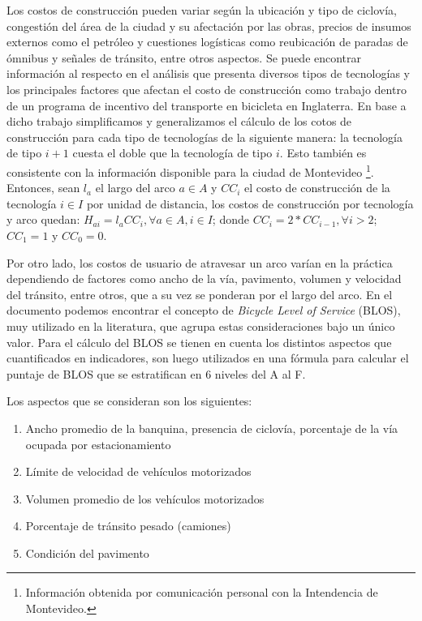 Los costos de construcción pueden variar según la ubicación y tipo de ciclovía, congestión del área de la ciudad y su afectación por las obras, precios de insumos externos como el petróleo y cuestiones logísticas como reubicación de paradas de ómnibus y señales de tránsito, entre otros aspectos. Se puede encontrar información al respecto en el análisis \cite{typicalcostsofcylcing} que presenta diversos tipos de tecnologías y los principales factores que afectan el costo de construcción como trabajo dentro de un programa de incentivo del transporte en bicicleta en Inglaterra. En base a dicho trabajo simplificamos y generalizamos el cálculo de los cotos de construcción para cada tipo de tecnologías de la siguiente manera: la tecnología de tipo $i + 1$ cuesta el doble que la tecnología de tipo $i$. Esto también es consistente con la información disponible para la ciudad de Montevideo \footnote{Información obtenida por comunicación personal con la Intendencia de Montevideo.}. Entonces, sean $l_a$ el largo del arco $a \in A$ y $CC_i$ el costo de construcción de la tecnología $i \in I$ por unidad de distancia, los costos de construcción por tecnología y arco quedan: $H_{ai} = l_a CC_i, \forall a \in A, i \in I$; donde $CC_i = 2 * CC_{i-1}, \forall i > 2$; $CC_1 = 1$ y $CC_0 = 0$.

Por otro lado, los costos de usuario de atravesar un arco varían en la práctica dependiendo de factores como ancho de la vía, pavimento, volumen y velocidad del tránsito, entre otros, que a su vez se ponderan por el largo del arco. En el documento \cite{blos2007} podemos encontrar el concepto de {\it Bicycle Level of Service} (BLOS), muy utilizado en la literatura, que agrupa estas consideraciones bajo un único valor. Para el cálculo del BLOS se tienen en cuenta los distintos aspectos que cuantificados en indicadores, son luego utilizados en una fórmula para calcular el puntaje de BLOS que se estratifican en 6 niveles del A al F.

Los aspectos que se consideran son los siguientes:

\begin{enumerate}
  \item{Ancho promedio de la banquina, presencia de ciclovía, porcentaje de la vía ocupada por estacionamiento}
  \item{Límite de velocidad de vehículos motorizados}
  \item{Volumen promedio de los vehículos motorizados}
  \item{Porcentaje de tránsito pesado (camiones)}
  \item{Condición del pavimento}
\end{enumerate}

